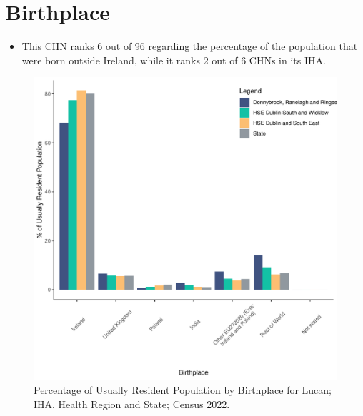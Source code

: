 \documentclass{article}
\begin{document}
\section{Birthplace}\label{sect:Birth}
\begin{itemize}
\item This CHN ranks  6 out of 96 regarding the percentage of the population that were born outside Ireland, while it ranks  2 out of 6 CHNs in its IHA.
\end{itemize}
\begin{figure}[H]
	\centering
	\includegraphics[width = 130mm]{../figures/BirthED.pdf}
	\caption{Percentage of Usually Resident Population by Birthplace for Lucan; IHA, Health Region and State; Census 2022.}
	\label{fig:vbnv}
	\end{figure}
	
\end{document}
